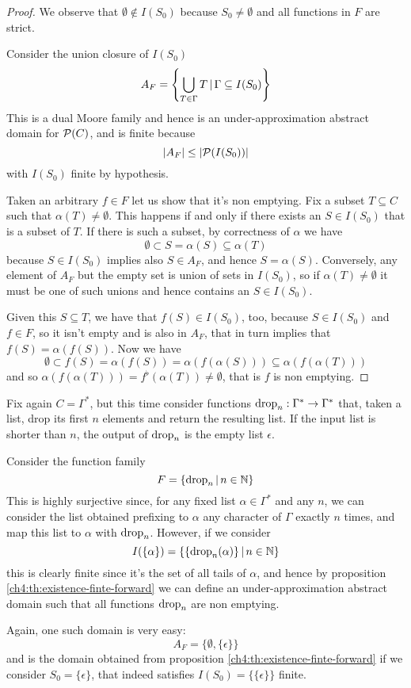 \begin{proof}
	We observe that $\emptyset \notin I(S_0)$ because $S_0 \neq \emptyset$ and all functions in $F$ are strict.

	Consider the union closure of $I(S_0)$
	\[
	A_F = \left\lbrace \bigcup\limits_{T \in \Gamma} T \,\vert\, \Gamma \subseteq I(S_0) \right\rbrace
	\]
	This is a dual Moore family and hence is an under-approximation abstract domain for $\mathcal{P}(C)$, and is finite because
	\[
	\lvert A_F\rvert \le \lvert\mathcal{P}(I(S_0))\rvert
	\]
	with $I(S_0)$ finite by hypothesis.

	Taken an arbitrary $f \in F$ let us show that it's non emptying.
	Fix a subset $T \subseteq C$ such that $\alpha(T) \neq \emptyset$. This happens if and only if there exists an $S \in I(S_0)$ that is a subset of $T$.
	If there is such a subset, by correctness of $\alpha$ we have
	\[
	\emptyset \subset S = \alpha(S) \subseteq \alpha(T)
	\]
	because $S \in I(S_0)$ implies also $S \in A_F$, and hence $S = \alpha(S)$.
	Conversely, any element of $A_F$ but the empty set is union of sets in $I(S_0)$, so if $\alpha(T) \neq \emptyset$ it must be one of such unions and hence contains an $S \in I(S_0)$.

	Given this $S \subseteq T$, we have that $f(S) \in I(S_0)$, too, because $S \in I(S_0)$ and $f \in F$, so it isn't empty and is also in $A_F$, that in turn implies that $f(S) = \alpha(f(S))$.
	Now we have
	\[
	\emptyset \subset f(S) = \alpha(f(S)) = \alpha(f(\alpha(S))) \subseteq \alpha(f(\alpha(T)))
	\]
	and so $\alpha(f(\alpha(T))) = f^{\flat}(\alpha(T)) \neq \emptyset$, that is $f$ is non emptying.
\end{proof}

\begin{example}
	Fix again $C = \Gamma^{*}$, but this time consider functions $\text{drop}_n : \Gamma^* \rightarrow \Gamma^*$ that, taken a list, drop its first $n$ elements and return the resulting list. If the input list is shorter than $n$, the output of $\text{drop}_n$ is the empty list $\epsilon$.

	Consider the function family
	\[
	F = \{ \text{drop}_n \,\vert\, n \in \mathbb{N} \}
	\]
	This is highly surjective since, for any fixed list $\alpha \in \Gamma^*$ and any $n$, we can consider the list obtained prefixing to $\alpha$ any character of $\Gamma$ exactly $n$ times, and map this list to $\alpha$ with $\text{drop}_n$.
	However, if we consider
	\[
	I(\{ \alpha \}) = \{ \{ \text{drop}_n(\alpha) \} \,\vert\, n \in \mathbb{N} \}
	\]
	this is clearly finite since it's the set of all tails of $\alpha$, and hence by proposition \ref{ch4:th:existence-finte-forward} we can define an under-approximation abstract domain such that all functions $\text{drop}_n$ are non emptying.

	Again, one such domain is very easy:
	\[
	A_F = \{ \emptyset, \{ \epsilon \} \}
	\]
	and is the domain obtained from proposition \ref{ch4:th:existence-finte-forward} if we consider $S_0 = \{ \epsilon \}$, that indeed satisfies $I(S_0) = \{ \{ \epsilon \} \}$ finite.
\end{example}

